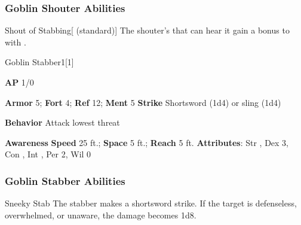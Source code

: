 \subsubsection{Goblin Shouter Abilities}

\begin{freeability}{Shout of Stabbing}[ (standard)]
The shouter's  that can hear it gain a  bonus to  with .
\end{freeability}

\begin{monsection}{Goblin Stabber}{1}[1]
\vspace{-1em}\vspace{-1em}
\begin{spellcontent}
\begin{spelltargetinginfo}
{\textbf{AP} 1/0}

\pari \textbf{Armor} 5;
\textbf{Fort} 4;
\textbf{Ref} 12;
\textbf{Ment} 5
\pari \textbf{Strike} Shortsword  (1d4) or sling  (1d4)



\pari \textbf{Behavior} Attack lowest threat
\end{spelltargetinginfo}
\end{spellcontent}

\begin{monsterfooter}
\pari \textbf{Awareness} 
\pari \textbf{Speed} 25 ft.;
\textbf{Space} 5 ft.;
\textbf{Reach} 5 ft.
\pari \textbf{Attributes}:
Str ,
Dex 3,
Con ,
Int ,
Per 2,
Wil 0
\end{monsterfooter}
\end{monsection}


\subsubsection{Goblin Stabber Abilities}

\begin{freeability}{Sneeky Stab}
The stabber makes a shortsword strike.
If the target is defenseless, overwhelmed, or unaware, the damage becomes 1d8.
\end{freeability}

